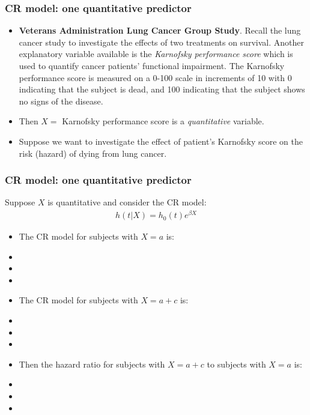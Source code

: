 \begin{frame}
\frametitle{CR model: one quantitative predictor}
\begin{itemize}
\item \textbf{Veterans Administration Lung Cancer Group Study}.  Recall the lung cancer study to investigate the effects of two treatments on survival.  Another explanatory variable available is the \textit{Karnofsky performance score} which is used to quantify cancer patients' functional impairment. The Karnofsky performance score is measured on a 0-100 scale in increments of 10 with 0 indicating that the subject is dead, and 100 indicating that the subject shows no signs of the disease.

\item Then $X=$ Karnofsky performance score is a \textit{quantitative} variable.

\item Suppose we want to investigate the effect of patient's Karnofsky score on the risk (hazard) of dying from lung cancer.
\end{itemize}
\end{frame}

\begin{frame}
\frametitle{CR model: one quantitative predictor}
Suppose $X$ is quantitative and consider the CR model:
\emp
{}
\begin{eqnarray}
\boxed{h(t|X) = h_0(t)e^{\beta X}} \nonumber
\end{eqnarray}
\emp
\begin{itemize}
\item The CR model for subjects with $X=a$ is:
\item[]
\item[]
\item[]
\item The CR model for subjects with $X=a+c$ is:
\item[]
\item[]
\item[]
\item Then the hazard ratio for subjects with $X=a+c$ to subjects with $X=a$ is:
\item[]
\item[]
\item[]
\end{itemize}
\end{frame}

